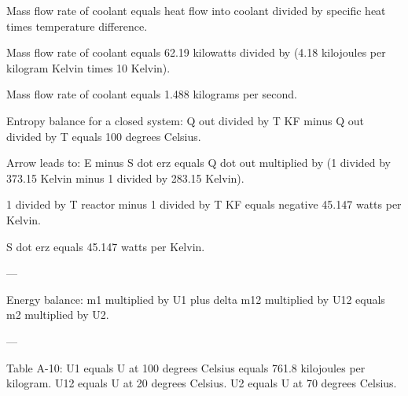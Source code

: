 Mass flow rate of coolant equals heat flow into coolant divided by specific heat times temperature difference.  

Mass flow rate of coolant equals 62.19 kilowatts divided by (4.18 kilojoules per kilogram Kelvin times 10 Kelvin).  

Mass flow rate of coolant equals 1.488 kilograms per second.

Entropy balance for a closed system:  
Q out divided by T KF minus Q out divided by T equals 100 degrees Celsius.  

Arrow leads to:  
E minus S dot erz equals Q dot out multiplied by (1 divided by 373.15 Kelvin minus 1 divided by 283.15 Kelvin).  

1 divided by T reactor minus 1 divided by T KF equals negative 45.147 watts per Kelvin.  

S dot erz equals 45.147 watts per Kelvin.  

---

Energy balance:  
m1 multiplied by U1 plus delta m12 multiplied by U12 equals m2 multiplied by U2.  

---

Table A-10:  
U1 equals U at 100 degrees Celsius equals 761.8 kilojoules per kilogram.  
U12 equals U at 20 degrees Celsius.  
U2 equals U at 70 degrees Celsius.